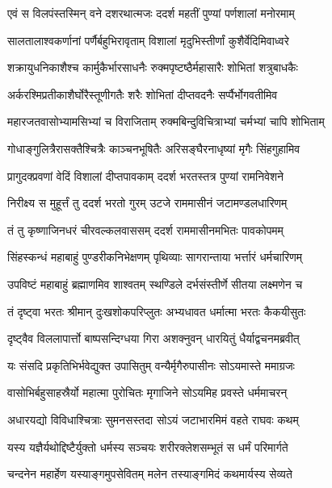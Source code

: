\twolineshloka
{एवं स विलपंस्तस्मिन् वने दशरथात्मजः}
{ददर्श महतीं पुण्यां पर्णशालां मनोरमाम्} %

\twolineshloka
{सालतालाश्वकर्णानां पर्णैर्बहुभिरावृताम्}
{विशालां मृदुभिस्तीर्णां कुशैर्वेदिमिवाध्वरे} %

\twolineshloka
{शक्रायुधनिकाशैश्च कार्मुकैर्भारसाधनैः}
{रुक्मपृष्टष्ठैर्महासारैः शोभितां शत्रुबाधकैः} %

\twolineshloka
{अर्करश्मिप्रतीकाशैर्घोरैस्तूणीगतैः शरैः}
{शोभितां दीप्तवदनैः सर्प्पैर्भोगवतीमिव} %

\twolineshloka
{महारजतवासोभ्यामसिभ्यां च विराजिताम्}
{रुक्मबिन्दुविचित्राभ्यां चर्मभ्यां चापि शोभिताम्} %

\twolineshloka
{गोधाङ्गुलित्रैरासक्तैश्चित्रैः काञ्चनभूषितैः}
{अरिसङ्घैरनाधृष्यां मृगैः सिंहगुहामिव} %

\twolineshloka
{प्रागुदक्प्रवणां वेदिं विशालां दीप्तपावकाम्}
{ददर्श भरतस्तत्र पुण्यां रामनिवेशने} %

\twolineshloka
{निरीक्ष्य स मुहूर्त्तं तु ददर्श भरतो गुरम्}
{उटजे राममासीनं जटामण्डलधारिणम्} %

\twolineshloka
{तं तु कृष्णाजिनधरं चीरवल्कलवाससम्}
{ददर्श राममासीनमभितः पावकोपमम्} %

\twolineshloka
{सिंहस्कन्धं महाबाहुं पुण्डरीकनिभेक्षणम्}
{पृथिव्याः सागरान्ताया भर्त्तारं धर्मचारिणम्} %

\twolineshloka
{उपविष्टं महाबाहुं ब्रह्माणमिव शाश्वतम्}
{स्थण्डिले दर्भसंस्तीर्णे सीतया लक्ष्मणेन च} %

\twolineshloka
{तं दृष्ट्वा भरतः श्रीमान् दुःखशोकपरिप्लुतः}
{अभ्यधावत धर्मात्मा भरतः कैकयीसुतः} %

\twolineshloka
{दृष्ट्वैव विललापार्त्तो बाष्पसन्दिग्धया गिरा}
{अशक्नुवन् धारयितुं धैर्याद्वचनमब्रवीत्} %

\twolineshloka
{यः संसदि प्रकृतिभिर्भवेद्युक्त उपासितुम्}
{वन्यैर्मृगैरुपासीनः सोऽयमास्ते ममाग्रजः} %

\twolineshloka
{वासोभिर्बहुसाहस्रैर्यो महात्मा पुरोचितः}
{मृगाजिने सोऽयमिह प्रवस्ते धर्ममाचरन्} %

\onelineshloka
{अधारयद्यो विविधाश्चित्राः सुमनसस्तदा सोऽयं जटाभारमिमं वहते राघवः कथम्} %

\twolineshloka
{यस्य यज्ञैर्यथोद्दिष्टैर्युक्तो धर्मस्य सञ्चयः}
{शरीरक्लेशसम्भूतं स धर्मं परिमार्गते} %

\twolineshloka
{चन्दनेन महार्हेण यस्याङ्गमुपसेवितम्}
{मलेन तस्याङ्गमिदं कथमार्यस्य सेव्यते} %


